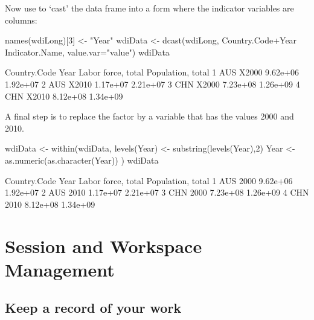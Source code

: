 Now
 use  to `cast' the data frame into a form where the
indicator variables are columns:
\begin{fullwidth}

\begin{Schunk}
\begin{Sinput}
names(wdiLong)[3] <- "Year"
wdiData <- dcast(wdiLong,
                 Country.Code+Year ~ Indicator.Name,
                 value.var="value")
wdiData
\end{Sinput}
\begin{Soutput}
  Country.Code  Year Labor force, total Population, total
1          AUS X2000           9.62e+06          1.92e+07
2          AUS X2010           1.17e+07          2.21e+07
3          CHN X2000           7.23e+08          1.26e+09
4          CHN X2010           8.12e+08          1.34e+09
\end{Soutput}
\end{Schunk}

\end{fullwidth}

A final step is to replace the factor  by a variable that
has the values 2000 and 2010.
\begin{fullwidth}

\begin{Schunk}
\begin{Sinput}
wdiData <- within(wdiData, {
   levels(Year) <- substring(levels(Year),2)
   Year <- as.numeric(as.character(Year))
})
wdiData
\end{Sinput}
\begin{Soutput}
  Country.Code Year Labor force, total Population, total
1          AUS 2000           9.62e+06          1.92e+07
2          AUS 2010           1.17e+07          2.21e+07
3          CHN 2000           7.23e+08          1.26e+09
4          CHN 2010           8.12e+08          1.34e+09
\end{Soutput}
\end{Schunk}

\end{fullwidth}

\section{Session and Workspace Management}

\subsection{Keep a record of your work}

